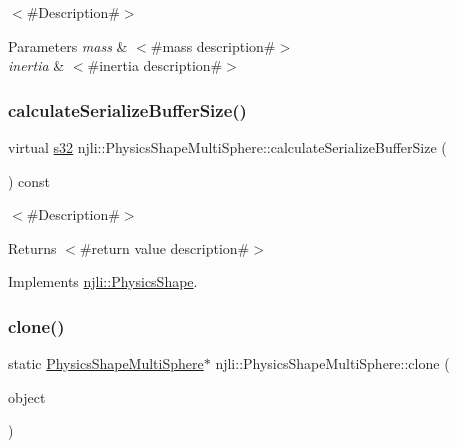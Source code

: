 $<$\#\+Description\#$>$


\begin{DoxyParams}{Parameters}
{\em mass} & $<$\#mass description\#$>$ \\
\hline
{\em inertia} & $<$\#inertia description\#$>$ \\
\hline
\end{DoxyParams}
\mbox{\label{classnjli_1_1_physics_shape_multi_sphere_a0a9f8e9382af4fb1115abf8bcb035931}} 
\subsubsection{\texorpdfstring{calculate\+Serialize\+Buffer\+Size()}{calculateSerializeBufferSize()}}
{\footnotesize\ttfamily virtual \mbox{\hyperlink{_util_8h_aa62c75d314a0d1f37f79c4b73b2292e2}{s32}} njli\+::\+Physics\+Shape\+Multi\+Sphere\+::calculate\+Serialize\+Buffer\+Size (\begin{DoxyParamCaption}{ }\end{DoxyParamCaption}) const\hspace{0.3cm}{\ttfamily [virtual]}}

$<$\#\+Description\#$>$

\begin{DoxyReturn}{Returns}
$<$\#return value description\#$>$ 
\end{DoxyReturn}


Implements \mbox{\hyperlink{classnjli_1_1_physics_shape_a0612a1c8c3f4520d78cb7f5838f03074}{njli\+::\+Physics\+Shape}}.

\mbox{\label{classnjli_1_1_physics_shape_multi_sphere_a465246d891108d982e8c18bdf2c49917}} 
\subsubsection{\texorpdfstring{clone()}{clone()}}
{\footnotesize\ttfamily static \mbox{\hyperlink{classnjli_1_1_physics_shape_multi_sphere}{Physics\+Shape\+Multi\+Sphere}}$\ast$ njli\+::\+Physics\+Shape\+Multi\+Sphere\+::clone (\begin{DoxyParamCaption}\item[{const \mbox{\hyperlink{classnjli_1_1_physics_shape_multi_sphere}{Physics\+Shape\+Multi\+Sphere}} \&}]{object }\end{DoxyParamCaption})\hspace{0.3cm}{\ttfamily [static]}}

